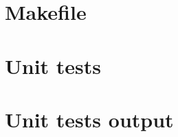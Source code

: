 \begin{scriptsize}
\begin{ttfamily}

\end{ttfamily}
\end{scriptsize}

\section{Makefile}

\begin{scriptsize}
\begin{ttfamily}

\end{ttfamily}
\end{scriptsize}

\section{Unit tests}

\begin{scriptsize}
\begin{ttfamily}

\end{ttfamily}
\end{scriptsize}

\section{Unit tests output}

\begin{scriptsize}
\begin{ttfamily}

\end{ttfamily}
\end{scriptsize}

